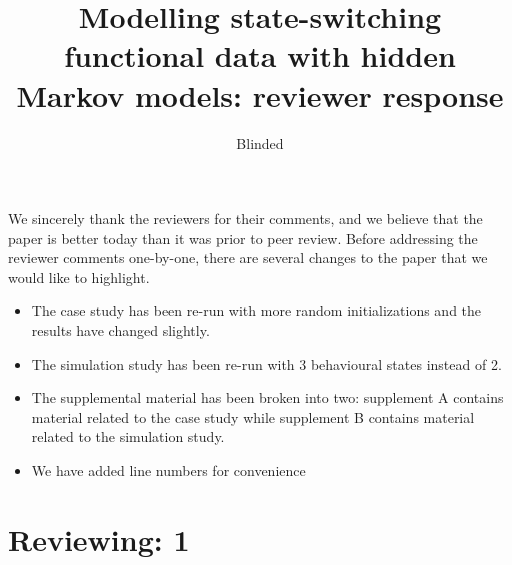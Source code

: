 \documentclass{article}
\begin{document}
\title{Modelling state-switching functional data with hidden Markov models: reviewer response}
\date{}
\author{Blinded}

\maketitle

We sincerely thank the reviewers for their comments, and we believe that the paper is better today than it was prior to peer review. Before addressing the reviewer comments one-by-one, there are several changes to the paper that we would like to highlight.

\begin{itemize}
    \item The case study has been re-run with more random initializations and the results have changed slightly.
    \item The simulation study has been re-run with 3 behavioural states instead of 2.
    \item The supplemental material has been broken into two: supplement A contains material related to the case study while supplement B contains material related to the simulation study. 
    \item We have added line numbers for convenience
\end{itemize}


\section{Reviewing: 1}
\end{document}
